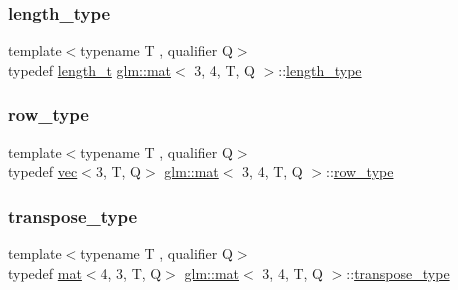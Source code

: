 \mbox{\label{structglm_1_1mat_3_013_00_014_00_01_t_00_01_q_01_4_a6a07c3870b8e6d4ba5f1ec8fa988d9bf}} 
\subsubsection{\texorpdfstring{length\+\_\+type}{length\_type}}
{\footnotesize\ttfamily template$<$typename T , qualifier Q$>$ \\
typedef \hyperlink{namespaceglm_a090a0de2260835bee80e71a702492ed9}{length\+\_\+t} \hyperlink{structglm_1_1mat}{glm\+::mat}$<$ 3, 4, T, Q $>$\+::\hyperlink{structglm_1_1mat_3_013_00_014_00_01_t_00_01_q_01_4_a6a07c3870b8e6d4ba5f1ec8fa988d9bf}{length\+\_\+type}}

\mbox{\label{structglm_1_1mat_3_013_00_014_00_01_t_00_01_q_01_4_a14121d7d6181d3e9eea914373f795c6c}} 
\subsubsection{\texorpdfstring{row\+\_\+type}{row\_type}}
{\footnotesize\ttfamily template$<$typename T , qualifier Q$>$ \\
typedef \hyperlink{structglm_1_1vec}{vec}$<$3, T, Q$>$ \hyperlink{structglm_1_1mat}{glm\+::mat}$<$ 3, 4, T, Q $>$\+::\hyperlink{structglm_1_1mat_3_013_00_014_00_01_t_00_01_q_01_4_a14121d7d6181d3e9eea914373f795c6c}{row\+\_\+type}}

\mbox{\label{structglm_1_1mat_3_013_00_014_00_01_t_00_01_q_01_4_af38d159b4f750dd5fab7d19b44c82731}} 
\subsubsection{\texorpdfstring{transpose\+\_\+type}{transpose\_type}}
{\footnotesize\ttfamily template$<$typename T , qualifier Q$>$ \\
typedef \hyperlink{structglm_1_1mat}{mat}$<$4, 3, T, Q$>$ \hyperlink{structglm_1_1mat}{glm\+::mat}$<$ 3, 4, T, Q $>$\+::\hyperlink{structglm_1_1mat_3_013_00_014_00_01_t_00_01_q_01_4_af38d159b4f750dd5fab7d19b44c82731}{transpose\+\_\+type}}

